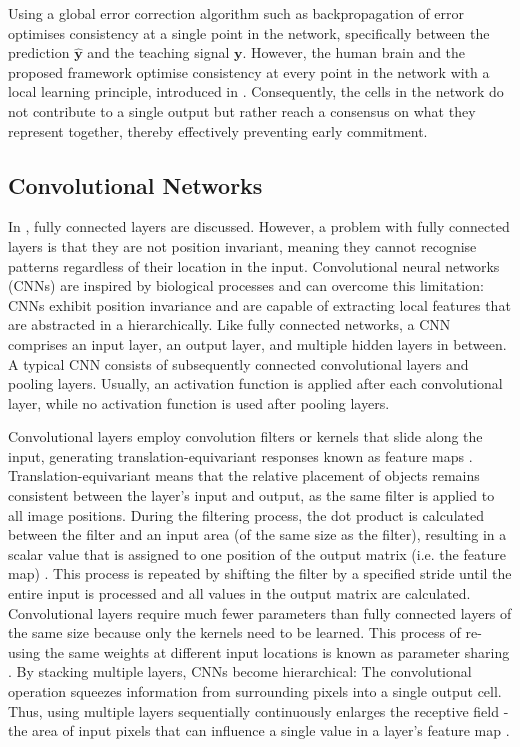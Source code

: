 Using a global error correction algorithm such as backpropagation of error optimises consistency at a single point in the network, specifically between the prediction $\boldsymbol{\hat{y}}$ and the teaching signal $\boldsymbol{y}$.
However, the human brain and the proposed framework optimise consistency at every point in the network with a local learning principle, introduced in  . Consequently, the cells in the network do not contribute to a single output but rather reach a consensus on what they represent together, thereby effectively preventing early commitment. 


\subsection{Convolutional Networks}
In , fully connected layers are discussed.
However, a problem with fully connected layers is that they are not position invariant, meaning they cannot recognise patterns regardless of their location in the input.
Convolutional neural networks (CNNs)  are inspired by biological processes  and can overcome this limitation: CNNs exhibit position invariance and are capable of extracting local features that are abstracted in a hierarchically.
Like fully connected networks, a CNN comprises an input layer, an output layer, and multiple hidden layers in between.
A typical CNN consists of subsequently connected convolutional layers and pooling layers.
Usually, an activation function is applied after each convolutional layer, while no activation function is used after pooling layers.

Convolutional layers employ convolution filters or kernels that slide along the input, generating translation-equivariant  responses known as feature maps \cite{zhang_parallel_1990}.
Translation-equivariant means that the relative placement of objects remains consistent between the layer's input and output, as the same filter is applied to all image positions.
During the filtering process, the dot product is calculated between the filter and an input area (of the same size as the filter), resulting in a scalar value that is assigned to one position of the output matrix (i.e. the feature map) .
This process is repeated by shifting the filter by a specified stride until the entire input is processed and all values in the output matrix are calculated.
Convolutional layers require much fewer parameters than fully connected layers of the same size because only the kernels need to be learned.
This process of re-using the same weights at different input locations is known as parameter sharing .
By stacking multiple layers, CNNs become hierarchical: The convolutional operation squeezes information from surrounding pixels into a single output cell. Thus, using multiple layers sequentially continuously enlarges the receptive field - the area of input pixels that can influence a single value in a layer's feature map .

